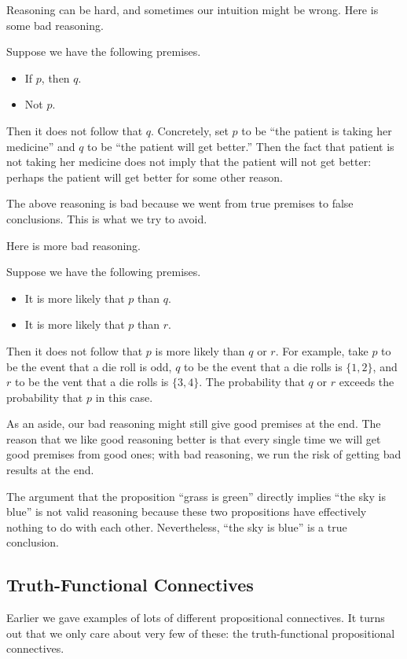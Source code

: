 \documentclass[../notes.tex]{subfiles}
\begin{document}
Reasoning can be hard, and sometimes our intuition might be wrong. Here is some bad reasoning.
\begin{nex}
	Suppose we have the following premises.
	\begin{itemize}
		\item If $p$, then $q$.
		\item Not $p$.
	\end{itemize}
	Then it does not follow that $q$. Concretely, set $p$ to be ``the patient is taking her medicine'' and $q$ to be ``the patient will get better.'' Then the fact that patient is not taking her medicine does not imply that the patient will not get better: perhaps the patient will get better for some other reason.
\end{nex}
The above reasoning is bad because we went from true premises to false conclusions. This is what we try to avoid.

Here is more bad reasoning.
\begin{nex}
	Suppose we have the following premises.
	\begin{itemize}
		\item It is more likely that $p$ than $q$.
		\item It is more likely that $p$ than $r$.
	\end{itemize}
	Then it does not follow that $p$ is more likely than $q$ or $r$. For example, take $p$ to be the event that a die roll is odd, $q$ to be the event that a die rolls is $\{1,2\}$, and $r$ to be the vent that a die rolls is $\{3,4\}$. The probability that $q$ or $r$ exceeds the probability that $p$ in this case.
\end{nex}
As an aside, our bad reasoning might still give good premises at the end. The reason that we like good reasoning better is that every single time we will get good premises from good ones; with bad reasoning, we run the risk of getting bad results at the end.
\begin{example}
	The argument that the proposition ``grass is green'' directly implies ``the sky is blue'' is not valid reasoning because these two propositions have effectively nothing to do with each other. Nevertheless, ``the sky is blue'' is a true conclusion.
\end{example}

\subsection{Truth-Functional Connectives}
Earlier we gave examples of lots of different propositional connectives. It turns out that we only care about very few of these: the truth-functional propositional connectives.
\end{document}
